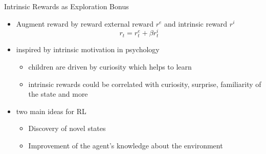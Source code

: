 \begin{frame}[c]{Intrinsic Rewards as Exploration Bonus}
	
	\begin{itemize}
		\item Augment reward by reward external reward $r^e$ and intrinsic reward $r^i$
		$$r_t = r^e_t + \beta r_t^i $$
		\item inspired by intrinsic motivation in psychology
		\begin{itemize}
			\item children are driven by curiosity which helps to learn
			\item intrinsic rewards could be correlated with curiosity, surprise, familiarity of the state and more
		\end{itemize}
		\item two main ideas for RL
		\begin{itemize}
			\item Discovery of novel states
			\item Improvement of the agent's knowledge about the environment
		\end{itemize}
	\end{itemize}
	
\end{frame}


